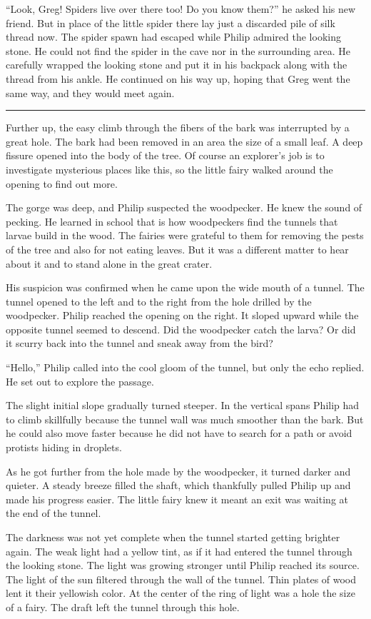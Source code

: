\documentclass[10pt, draft]{memoir}
\renewcommand{\pfbreakdisplay}{\bigskip \ding{166} \bigskip}
\newcommand{\secbreak}{\fancybreak{\pfbreakdisplay}}
\begin{document}
``Look, Greg! Spiders live over there too! Do you know them?'' he asked his new
friend. But in place of the little spider there lay just a discarded pile of
silk thread now. The spider spawn had escaped while Philip admired the looking
stone. He could not find the spider in the cave nor in the surrounding area. He
carefully wrapped the looking stone and put it in his backpack along with the
thread from his ankle. He continued on his way up, hoping that Greg went the
same way, and they would meet again.

\secbreak

Further up, the easy climb through the fibers of the bark was interrupted by a
great hole. The bark had been removed in an area the size of a small leaf. A
deep fissure opened into the body of the tree. Of course an explorer's job is
to investigate mysterious places like this, so the little fairy walked around
the opening to find out more.

The gorge was deep, and Philip suspected the woodpecker. He knew the sound of
pecking. He learned in school that is how woodpeckers find the tunnels that
larvae build in the wood. The fairies were grateful to them for removing the
pests of the tree and also for not eating leaves. But it was a different matter
to hear about it and to stand alone in the great crater.

His suspicion was confirmed when he came upon the wide mouth of a tunnel. The
tunnel opened to the left and to the right from the hole drilled by the
woodpecker. Philip reached the opening on the right. It sloped upward while the
opposite tunnel seemed to descend. Did the woodpecker catch the larva? Or did
it scurry back into the tunnel and sneak away from the bird?

``Hello,'' Philip called into the cool gloom of the tunnel, but only the echo
replied. He set out to explore the passage.

The slight initial slope gradually turned steeper. In the vertical spans Philip
had to climb skillfully because the tunnel wall was much smoother than the
bark. But he could also move faster because he did not have to search for a
path or avoid protists hiding in droplets.

As he got further from the hole made by the woodpecker, it turned darker and
quieter. A steady breeze filled the shaft, which thankfully pulled Philip up
and made his progress easier. The little fairy knew it meant an exit was
waiting at the end of the tunnel.

The darkness was not yet complete when the tunnel started getting brighter
again. The weak light had a yellow tint, as if it had entered the tunnel
through the looking stone. The light was growing stronger until Philip reached
its source. The light of the sun filtered through the wall of the tunnel. Thin
plates of wood lent it their yellowish color. At the center of the ring of
light was a hole the size of a fairy. The draft left the tunnel through this
hole.
\end{document}
